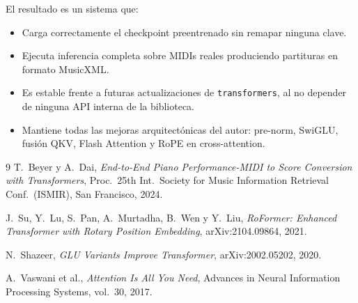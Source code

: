 \documentclass[12pt,a4paper]{article}
\begin{document}
El resultado es un sistema que:
\begin{itemize}
  \item Carga correctamente el checkpoint preentrenado sin remapar ninguna clave.
  \item Ejecuta inferencia completa sobre MIDIs reales produciendo partituras en
        formato MusicXML.
  \item Es estable frente a futuras actualizaciones de \texttt{transformers}, al no
        depender de ninguna API interna de la biblioteca.
  \item Mantiene todas las mejoras arquitectónicas del autor: pre-norm, SwiGLU,
        fusión QKV, Flash Attention y RoPE en cross-attention.
\end{itemize}

\begin{thebibliography}{9}
  T.~Beyer y A.~Dai,
  \textit{End-to-End Piano Performance-MIDI to Score Conversion with Transformers},
  Proc.\ 25th Int.\ Society for Music Information Retrieval Conf.\ (ISMIR),
  San Francisco, 2024.

  J.~Su, Y.~Lu, S.~Pan, A.~Murtadha, B.~Wen y Y.~Liu,
  \textit{RoFormer: Enhanced Transformer with Rotary Position Embedding},
  arXiv:2104.09864, 2021.

  N.~Shazeer,
  \textit{GLU Variants Improve Transformer},
  arXiv:2002.05202, 2020.

  A.~Vaswani et al.,
  \textit{Attention Is All You Need},
  Advances in Neural Information Processing Systems, vol.~30, 2017.
\end{thebibliography}
\end{document}
